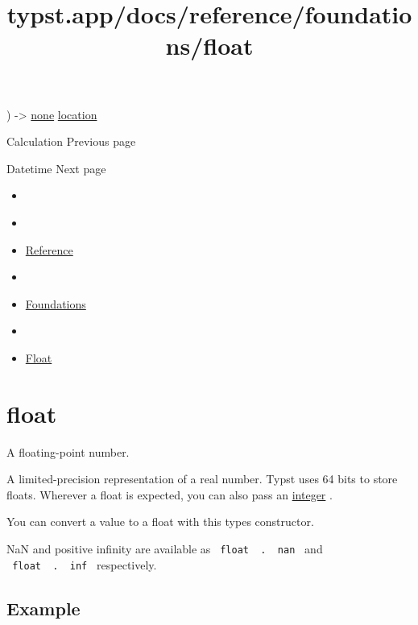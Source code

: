 ) -\textgreater{} \href{/docs/reference/foundations/none/}{none}
\href{/docs/reference/introspection/location/}{location}

\href{/docs/reference/foundations/calc/}{\pandocbounded{}}

{ Calculation } { Previous page }

\href{/docs/reference/foundations/datetime/}{\pandocbounded{}}

{ Datetime } { Next page }


\title{typst.app/docs/reference/foundations/float}

\begin{itemize}
\tightlist
\item
  \href{/docs}{}
\item
  
\item
  \href{/docs/reference/}{Reference}
\item
  
\item
  \href{/docs/reference/foundations/}{Foundations}
\item
  
\item
  \href{/docs/reference/foundations/float/}{Float}
\end{itemize}

\section{\texorpdfstring{{ float }}{ float }}\label{summary}

A floating-point number.

A limited-precision representation of a real number. Typst uses 64 bits
to store floats. Wherever a float is expected, you can also pass an
\href{/docs/reference/foundations/int/}{integer} .

You can convert a value to a float with this type\textquotesingle s
constructor.

NaN and positive infinity are available as
\texttt{\ float\ }{\texttt{\ .\ }}\texttt{\ nan\ } and
\texttt{\ float\ }{\texttt{\ .\ }}\texttt{\ inf\ } respectively.

\subsection{Example}\label{example}

